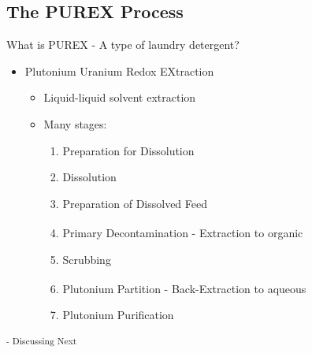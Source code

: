 \documentclass{beamer}
\begin{document}
\subsection{The PUREX Process}
\begin{frame}{What is PUREX - A type of laundry detergent?}
  \vspace{0.5cm}
  \begin{itemize}
  \item Plutonium Uranium Redox EXtraction 
    \begin{itemize}
    \item Liquid-liquid solvent extraction
    \item Many stages:
      \begin{enumerate}
      \item{Preparation for Dissolution}
      \item{Dissolution}
      \item{Preparation of Dissolved Feed}
      \item{Primary Decontamination - Extraction to
        organic\textsuperscript{\tiny{\AsteriskThin}}}
      \item{Scrubbing}
      \item{Plutonium Partition - Back-Extraction to
        aqueous\textsuperscript{\tiny{\AsteriskThin}}}
      \item{Plutonium Purification}
      \end{enumerate}
    \end{itemize}
  \end{itemize}
  \vspace{1.5cm}
  \textsuperscript{\tiny{\AsteriskThin\hspace{1mm}- Discussing Next}}
\end{frame}
\end{document}
